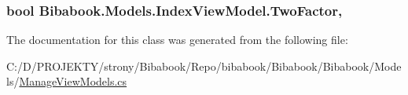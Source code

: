 \subsubsection[{Two\+Factor}]{\setlength{\rightskip}{0pt plus 5cm}bool Bibabook.\+Models.\+Index\+View\+Model.\+Two\+Factor\hspace{0.3cm}{\ttfamily [get]}, {\ttfamily [set]}}\label{class_bibabook_1_1_models_1_1_index_view_model_a383ac98d84ba3542cd9f94377c19c65f}


The documentation for this class was generated from the following file\+:\begin{DoxyCompactItemize}
\item 
C\+:/\+D/\+P\+R\+O\+J\+E\+K\+T\+Y/strony/\+Bibabook/\+Repo/bibabook/\+Bibabook/\+Bibabook/\+Models/\hyperlink{_manage_view_models_8cs}{Manage\+View\+Models.\+cs}\end{DoxyCompactItemize}
